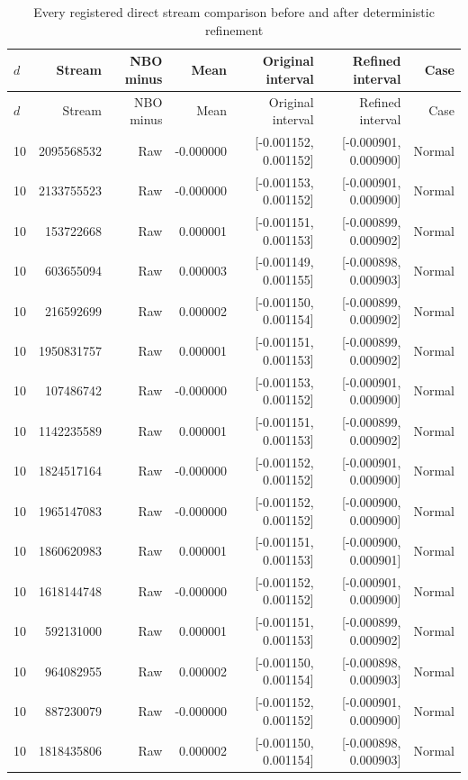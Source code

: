 \begingroup\small
\begin{longtable}{lrrrrrr}
\caption{Every registered direct stream comparison before and after deterministic refinement}\label{tab:r15-paired-refined-seeds}\\
\toprule
$d$ & Stream & NBO minus & Mean & Original interval & Refined interval & Case \\
\midrule
\endfirsthead
\toprule
$d$ & Stream & NBO minus & Mean & Original interval & Refined interval & Case \\
\midrule
\endhead
10 & 2095568532 & Raw & -0.000000 & [-0.001152, 0.001152] & [-0.000901, 0.000900] & Normal \\
10 & 2133755523 & Raw & -0.000000 & [-0.001153, 0.001152] & [-0.000901, 0.000900] & Normal \\
10 & 153722668 & Raw & 0.000001 & [-0.001151, 0.001153] & [-0.000899, 0.000902] & Normal \\
10 & 603655094 & Raw & 0.000003 & [-0.001149, 0.001155] & [-0.000898, 0.000903] & Normal \\
10 & 216592699 & Raw & 0.000002 & [-0.001150, 0.001154] & [-0.000899, 0.000902] & Normal \\
10 & 1950831757 & Raw & 0.000001 & [-0.001151, 0.001153] & [-0.000899, 0.000902] & Normal \\
10 & 107486742 & Raw & -0.000000 & [-0.001153, 0.001152] & [-0.000901, 0.000900] & Normal \\
10 & 1142235589 & Raw & 0.000001 & [-0.001151, 0.001153] & [-0.000899, 0.000902] & Normal \\
10 & 1824517164 & Raw & -0.000000 & [-0.001152, 0.001152] & [-0.000901, 0.000900] & Normal \\
10 & 1965147083 & Raw & -0.000000 & [-0.001152, 0.001152] & [-0.000900, 0.000900] & Normal \\
10 & 1860620983 & Raw & 0.000001 & [-0.001151, 0.001153] & [-0.000900, 0.000901] & Normal \\
10 & 1618144748 & Raw & -0.000000 & [-0.001152, 0.001152] & [-0.000901, 0.000900] & Normal \\
10 & 592131000 & Raw & 0.000001 & [-0.001151, 0.001153] & [-0.000899, 0.000902] & Normal \\
10 & 964082955 & Raw & 0.000002 & [-0.001150, 0.001154] & [-0.000898, 0.000903] & Normal \\
10 & 887230079 & Raw & -0.000000 & [-0.001152, 0.001152] & [-0.000901, 0.000900] & Normal \\
10 & 1818435806 & Raw & 0.000002 & [-0.001150, 0.001154] & [-0.000898, 0.000903] & Normal \\

\end{longtable}
